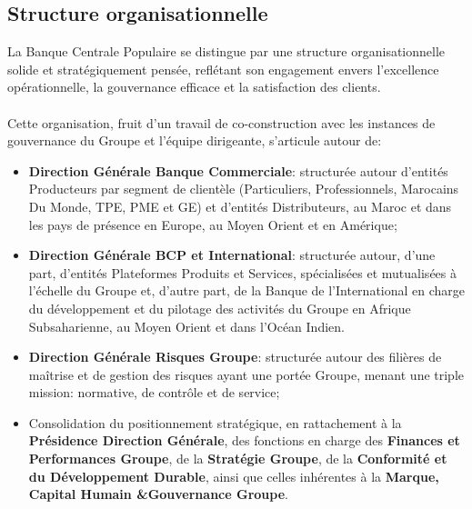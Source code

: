 \subsection{Structure organisationnelle}
La Banque Centrale Populaire se distingue par une structure organisationnelle solide et stratégiquement pensée, reflétant son engagement envers l'excellence opérationnelle, la gouvernance efficace et la satisfaction des clients. 
\\ \\
Cette organisation, fruit d’un travail de co-construction avec les instances de gouvernance du Groupe et l’équipe dirigeante, s’articule autour de:
\\

\begin{itemize}
    \item  \textbf{Direction Générale Banque Commerciale}: structurée autour d’entités Producteurs par segment de clientèle (Particuliers, Professionnels, Marocains Du Monde, TPE, PME et GE) et d’entités Distributeurs, au Maroc et dans les pays de
    présence en Europe, au Moyen Orient et en Amérique;
    \\
    \item \textbf{Direction Générale BCP et International}: structurée autour, d’une part, d’entités Plateformes Produits et Services, spécialisées
    et mutualisées à l’échelle du Groupe et, d’autre part, de la Banque de l’International en charge du développement et du pilotage des activités du Groupe en Afrique Subsaharienne, au Moyen Orient et dans l’Océan Indien.
    \\
    \item  \textbf{Direction Générale Risques Groupe}: structurée
    autour des filières de maîtrise et de gestion des risques ayant une portée Groupe,
    menant une triple mission: normative, de contrôle et de service;
    \\
    \item Consolidation du positionnement stratégique, en rattachement à la \textbf{Présidence Direction Générale}, des fonctions en charge des \textbf{Finances et Performances Groupe}, de la \textbf{Stratégie Groupe}, de la \textbf{Conformité et du Développement Durable}, ainsi que celles inhérentes à la \textbf{Marque, Capital Humain \&Gouvernance Groupe}.
\end{itemize}

